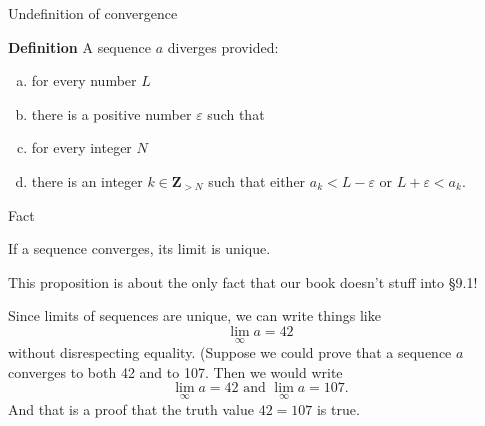 \documentclass[portrait,fleqn,12pt]{beamer}
\newenvironment{alphalist}
   {\begin{enumerate}[(a)]
       \addtolength{\itemsep}{0.0\itemsep}}
     {\end{enumerate}}
\newcommand{\integers}{\mathbf{Z}}
\newenvironment{define}[1]{
  \textbf{Definition} #1}{}
\begin{document}
\begin{frame}{Undefinition of convergence}

\begin{define} A sequence \(a\) diverges provided:
\begin{alphalist}
\item for every number \(L\) 
\item there is a positive number \(\varepsilon\) such that
\item for every integer \(N\) 
\item there is an integer \(k \in \integers_{> N}\)
such that either \(a_k < L - \varepsilon\) or \(L + \varepsilon < a_k\).
\end{alphalist}


\end{define}

\end{frame}
\begin{frame}{Fact}

  \begin{Theorem} If a sequence converges, its limit is
unique. 
  \end{Theorem}


This proposition is about the only fact that our
book doesn't stuff into \S9.1!

Since limits of sequences are unique, we can write things like
\begin{equation*}
  \lim_{\infty} a = 42
\end{equation*}
without disrespecting equality. (Suppose we could prove that a sequence 
$a$ converges to both 42 and to 107. Then we would write
\begin{equation*}
  \lim_{\infty} a = 42  \text{ and } \lim_{\infty} a = 107.
\end{equation*}
And that is a proof that the truth value $42 = 107$ is true.





\end{frame}
\end{document}
